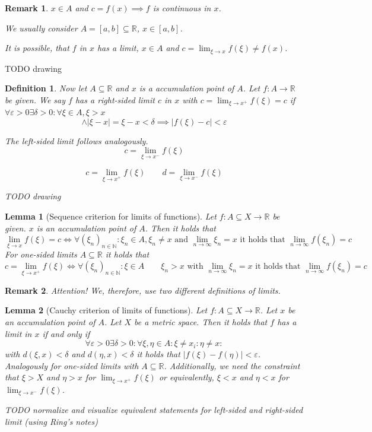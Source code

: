 \documentclass{article}
\newtheorem{definition}{Definition}  \numberwithin{definition}{section}
\newtheorem{lemma}{Lemma}  \numberwithin{lemma}{section}
\newtheorem{remark}{Remark}  \numberwithin{remark}{section}
\newcommand{\card}[1]{\left|#1\right|}
\begin{document}
\begin{remark}
  $x \in A$ and $c = f(x) \implies f$ is continuous in $x$.

  We usually consider $A = [a,b] \subseteq \mathbb R$, $x \in [a,b]$.

  It is possible, that $f$ in $x$ has a limit, $x \in A$ and $c = \lim_{\xi\to x} f(\xi) \neq f(x)$.
\end{remark}

TODO drawing

\begin{definition}
  Now let $A \subseteq \mathbb R$ and $x$ is a accumulation point of $A$.
  Let $f: A \to \mathbb R$ be given. We say $f$ has a right-sided limit $c$ in $x$
  with $c = \lim_{\xi \to x^+} f(\xi) = c$ if $\forall \varepsilon > 0 \exists \delta > 0: \forall \xi \in A, \xi > x$
  \[ \land  \card{\xi - x} = \xi - x < \delta \implies \card{f(\xi) - c} < \varepsilon \]

  The left-sided limit follows analogously.
  \[ c = \lim_{\xi \to x^-} f(\xi) \]

  \[ c = \lim_{\xi \to x^+} f(\xi) \qquad d = \lim_{\xi \to x^-} f(\xi) \]

  TODO drawing
\end{definition}

\begin{lemma}[Sequence criterion for limits of functions] %
  \label{lemma5}
  Let $f: A \subseteq X \to \mathbb R$ be given. $x$ is an accumulation point of $A$.
  Then it holds that
  \[ \lim_{\xi \to x} f(\xi) = c \iff \forall (\xi_n)_{n\in\mathbb N}: \xi_n \in A, \xi_n \neq x \text{ and } \lim_{n\to\infty} \xi_n = x \text{ it holds that } \lim_{n\to\infty} f(\xi_n) = c \]
  For one-sided limits $A \subseteq \mathbb R$ it holds that
  \[ c = \lim_{\xi\to x^{+}} f(\xi) \iff \forall (\xi_n)_{n\in\mathbb N}: \xi \in A \qquad \xi_n > x \text{ with } \lim_{n\to\infty} \xi_n = x \text{ it holds that } \lim_{n\to\infty} f(\xi_n) = c \]
\end{lemma}

\begin{remark}
  Attention! We, therefore, use two different definitions of limits.
\end{remark}

\begin{lemma}[Cauchy criterion of limits of functions] %
  \label{cauchy-crit}
  Let $f: A \subseteq X \to \mathbb R$. Let $x$ be an accumulation point of $A$.
  Let $X$ be a metric space. Then it holds that
  $f$ has a limit in $x$ if and only if
  \[ \forall \varepsilon > 0 \exists \delta > 0: \forall \xi, \eta \in A: \xi \neq x_i: \eta \neq x: \]
  with $d(\xi, x) < \delta$ and $d(\eta, x) < \delta$ it holds that $\card{f(\xi) - f(\eta)} < \varepsilon$.
  Analogously for one-sided limits with $A \subseteq \mathbb R$.
  Additionally, we need the constraint that $\xi > X$ and $\eta > x$ for $\lim_{\xi \to x^+} f(\xi)$ or equivalently,
  $\xi < x$ and $\eta < x$ for $\lim_{\xi \to x^-} f(\xi)$.

  TODO normalize and visualize equivalent statements for left-sided and right-sided limit (using Ring's notes)
\end{lemma}
\end{document}
